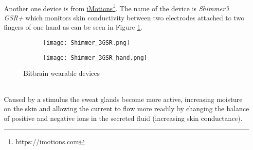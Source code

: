 \\ \indent
Another one device is from \href{https://imotions.com}{iMotions}\footnote{https://imotions.com}. The name of the device is \textit{Shimmer3 GSR+} which monitors skin conductivity between two electrodes attached to two fingers of one hand as can be seen in Figure \ref{fig:shimmer3}.
\begin{figure}[h]
    \centering
    \begin{subfigure}{{0.45\textwidth}}
    		\texttt{[image: Shimmer\_3GSR.png]}
    \end{subfigure}
    \begin{subfigure}{0.45\textwidth}
    		\texttt{[image: Shimmer\_3GSR\_hand.png]} 
    \end{subfigure}
    \caption{Bitbrain wearable devices}
    \label{fig:shimmer3}
\end{figure}
\\
Caused by a stimulus the sweat glands become more active, increasing moisture on the skin and allowing the current to flow more readily by changing the balance of positive and negative ions in the secreted fluid (increasing skin conductance).

\newpage
